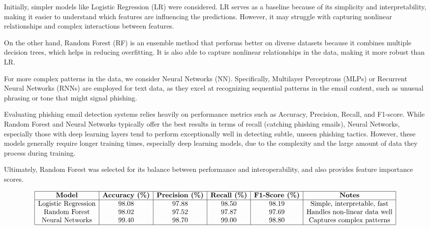 \documentclass{article}
\begin{document}
Initially, simpler models like Logistic Regression (LR) were considered. LR serves as a baseline because of its simplicity and interpretability, making it easier to understand which features are influencing the predictions. However, it may struggle with capturing nonlinear relationships and complex interactions between features.

On the other hand, Random Forest (RF) is an ensemble method that performs better on diverse datasets because it combines multiple decision trees, which helps in reducing overfitting. It is also able to capture nonlinear relationships in the data, making it more robust than LR.

For more complex patterns in the data, we consider Neural Networks (NN). Specifically, Multilayer Perceptrons (MLPs) or Recurrent Neural Networks (RNNs) are employed for text data, as they excel at recognizing sequential patterns in the email content, such as unusual phrasing or tone that might signal phishing. 

Evaluating phishing email detection systems relies heavily on performance metrics such as Accuracy, Precision, Recall, and F1-score. While Random Forest and Neural Networks typically offer the best results in terms of recall (catching phishing emails), Neural Networks, especially those with deep learning layers tend to perform exceptionally well in detecting subtle, unseen phishing tactics. However, these models generally require longer training times, especially deep learning models, due to the complexity and the large amount of data they process during training.

Ultimately, Random Forest was selected for its balance between performance and interoperability, and also provides feature importance scores.

\[
\begin{array}{|c|c|c|c|c|c|}
\hline
\textbf{Model} & \textbf{Accuracy (\%)} & \textbf{Precision (\%)} & \textbf{Recall (\%)} & \textbf{F1-Score (\%)} & \textbf{Notes} \\
\hline
\text{Logistic Regression} & 98.08 & 97.88 & 98.50 & 98.19 & \text{Simple, interpretable, fast} \\
\text{Random Forest} & 98.02 & 97.52 & 97.87 & 97.69 & \text{Handles non-linear data well} \\
\text{Neural Networks} & 99.40 & 98.70 & 99.00 & 98.80 & \text{Captures complex patterns} \\
\hline
\end{array}
\]
\newpage
\end{document}
